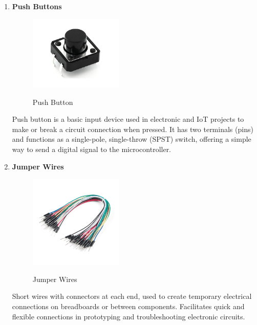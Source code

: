 {\begin{enumerate}
    \item \textbf{Push Buttons}\\
    \begin{figure}[H]
            \centering
            \includegraphics[width=1.75in]{push.png} \\
            \caption{Push Button}
            \label{fig:push-button} %
        \end{figure}
    Push button is a basic input device used in electronic and IoT projects to make or break a circuit connection when pressed. It has two terminals (pins) and functions as a single-pole, single-throw (SPST) switch, offering a simple way to send a digital signal to the microcontroller.
    
    \item \textbf{Jumper Wires}\\
    \begin{figure}[H]
            \centering
            \includegraphics[width=1.75in]{jumper-wire.jpg} \\
            \caption{Jumper Wires}
            \label{fig:jumper-wire} 
        \end{figure}
    Short wires with connectors at each end, used to create temporary electrical connections on breadboards or between components. Facilitates quick and flexible connections in prototyping and troubleshooting electronic circuits.
    

\end{enumerate}}
